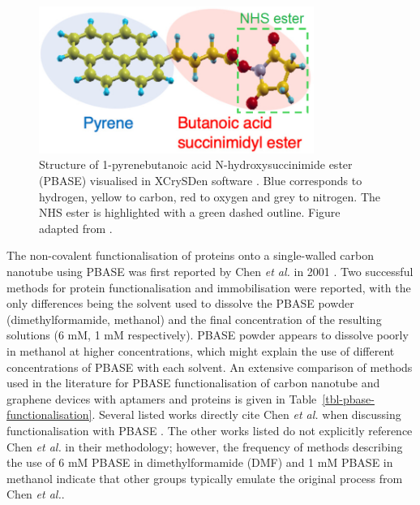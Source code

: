 \documentclass[
  a4paper,
]{scrbook}
\begin{document}
\begin{figure}

{\centering \includegraphics[width=0.8\textwidth,height=\textheight]{figures/ch6/PBASE_edit.png}

}

\caption[Structure of 1-pyrenebutanoic acid N-hydroxysuccinimide ester
(PBASE).]{\label{fig-pbase-structure}Structure of 1-pyrenebutanoic acid
N-hydroxysuccinimide ester (PBASE) visualised in XCrySDen software
\autocite{Kokalj1999}. Blue corresponds to hydrogen, yellow to carbon,
red to oxygen and grey to nitrogen. The NHS ester is highlighted with a
green dashed outline. Figure adapted from \autocite{Oishi2022}.}

\end{figure}

The non-covalent functionalisation of proteins onto a single-walled
carbon nanotube using PBASE was first reported by Chen \emph{et al.} in
2001 \autocite{Chen2001}. Two successful methods for protein
functionalisation and immobilisation were reported, with the only
differences being the solvent used to dissolve the PBASE powder
(dimethylformamide, methanol) and the final concentration of the
resulting solutions (6 mM, 1 mM respectively). PBASE powder appears to
dissolve poorly in methanol at higher concentrations, which might
explain the use of different concentrations of PBASE with each solvent.
An extensive comparison of methods used in the literature for PBASE
functionalisation of carbon nanotube and graphene devices with aptamers
and proteins is given in Table~\ref{tbl-pbase-functionalisation}.
Several listed works directly cite Chen \emph{et al.} when discussing
functionalisation with PBASE \autocite{Cella2010,Ohno2010,Zheng2016}.
The other works listed do not explicitly reference Chen \emph{et al.} in
their methodology; however, the frequency of methods describing the use
of 6 mM PBASE in dimethylformamide (DMF) and 1 mM PBASE in methanol
indicate that other groups typically emulate the original process from
Chen \emph{et al.}.
\end{document}
